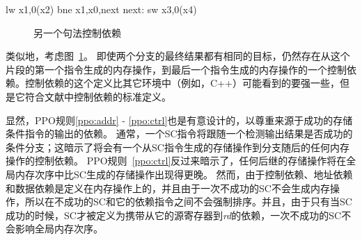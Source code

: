 \begin{verbbox}
        lw  x1,0(x2)
        bne x1,x0,next
  next: sw  x3,0(x4)
\end{verbbox}
\begin{figure}[h!]
  \centering\small
  \theverbbox
  \caption{另一个句法控制依赖  
  }
  \label{fig:litmus:control2}
\end{figure}

类似地，考虑图~\ref{fig:litmus:control2}。
即使两个分支的最终结果都有相同的目标，仍然存在从这个片段的第一个指令生成的内存操作，到最后一个指令生成的内存操作的一个控制依赖。控制依赖的这个定义比其它环境中（例如，C++）可能看到的要强一些，但是它符合文献中控制依赖的标准定义。

显然，PPO规则\ref{ppo:addr} - \ref{ppo:ctrl}也是有意设计的，以尊重来源于成功的存储条件指令的输出的依赖。
通常，一个SC指令将跟随一个检测输出结果是否成功的条件分支；这暗示了将会有一个从SC指令生成的存储操作到分支随后的任何内存操作的控制依赖。
PPO规则~\ref{ppo:ctrl}反过来暗示了，任何后继的存储操作将在全局内存次序中比SC生成的存储操作出现得更晚。
然而，由于控制依赖、地址依赖和数据依赖是定义在内存操作上的，并且由于一次不成功的SC不会生成内存操作，所以在不成功的SC和它的依赖指令之间不会强制排序。并且，由于只有当SC成功的时候，SC才被定义为携带从它的源寄存器到{\em rd}的依赖，一次不成功的SC不会影响全局内存次序。


